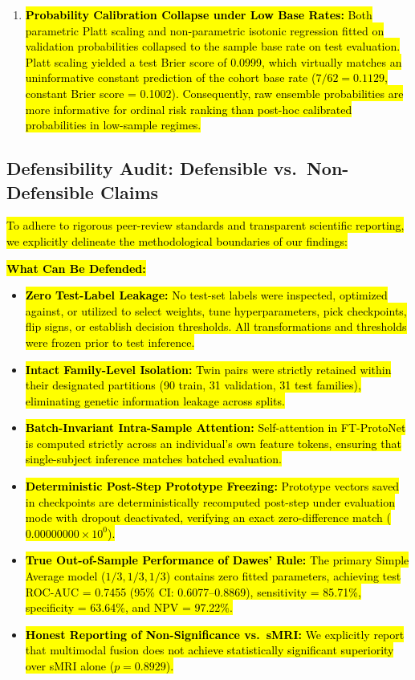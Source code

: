 \documentclass[10pt,letterpaper]{article}
\begin{document}
\begin{enumerate}
    \item \hl{\textbf{Probability Calibration Collapse under Low Base Rates:} Both parametric Platt scaling and non-parametric isotonic regression fitted on validation probabilities collapsed to the sample base rate on test evaluation. Platt scaling yielded a test Brier score of 0.0999, which virtually matches an uninformative constant prediction of the cohort base rate ($7/62 = 0.1129$, constant Brier score = 0.1002). Consequently, raw ensemble probabilities are more informative for ordinal risk ranking than post-hoc calibrated probabilities in low-sample regimes.}
\end{enumerate}

\subsection*{Defensibility Audit: Defensible vs.\ Non-Defensible Claims}

\hl{To adhere to rigorous peer-review standards and transparent scientific reporting, we explicitly delineate the methodological boundaries of our findings:}

\hl{\textbf{What Can Be Defended:}}
\begin{itemize}
    \item \hl{\textbf{Zero Test-Label Leakage:} No test-set labels were inspected, optimized against, or utilized to select weights, tune hyperparameters, pick checkpoints, flip signs, or establish decision thresholds. All transformations and thresholds were frozen prior to test inference.}
    \item \hl{\textbf{Intact Family-Level Isolation:} Twin pairs were strictly retained within their designated partitions (90 train, 31 validation, 31 test families), eliminating genetic information leakage across splits.}
    \item \hl{\textbf{Batch-Invariant Intra-Sample Attention:} Self-attention in FT-ProtoNet is computed strictly across an individual's own feature tokens, ensuring that single-subject inference matches batched evaluation.}
    \item \hl{\textbf{Deterministic Post-Step Prototype Freezing:} Prototype vectors saved in checkpoints are deterministically recomputed post-step under evaluation mode with dropout deactivated, verifying an exact zero-difference match ($0.00000000\times 10^0$).}
    \item \hl{\textbf{True Out-of-Sample Performance of Dawes' Rule:} The primary Simple Average model ($1/3, 1/3, 1/3$) contains zero fitted parameters, achieving test ROC-AUC = 0.7455 (95\% CI: 0.6077--0.8869), sensitivity = 85.71\%, specificity = 63.64\%, and NPV = 97.22\%.}
    \item \hl{\textbf{Honest Reporting of Non-Significance vs.\ sMRI:} We explicitly report that multimodal fusion does not achieve statistically significant superiority over sMRI alone ($p = 0.8929$).}
\end{itemize}
\end{document}
